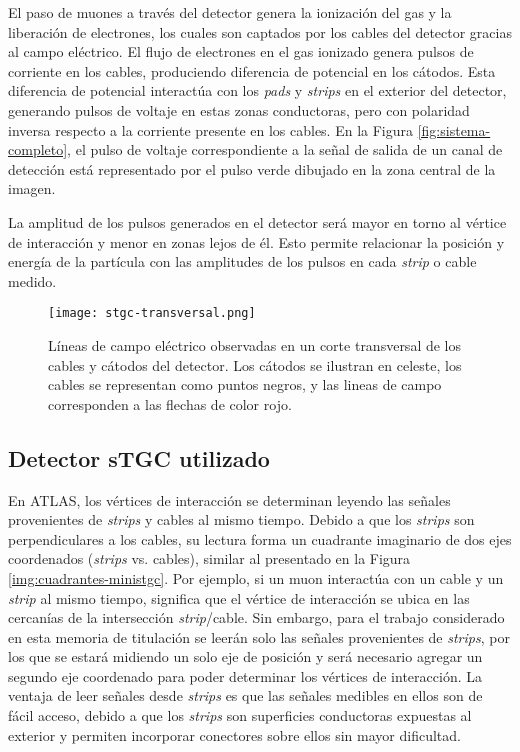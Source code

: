 	El paso de muones a través del detector genera la ionización del gas y la liberación de electrones, los cuales son captados por los cables del detector gracias al campo eléctrico. El flujo de electrones en el gas ionizado genera pulsos de corriente en los cables, produciendo diferencia de potencial en los cátodos. Esta diferencia de potencial interactúa con los \textit{pads} y \textit{strips} en el exterior del detector, generando pulsos de voltaje en estas zonas conductoras, pero con polaridad inversa respecto a la corriente presente en los cables. En la Figura \ref{fig:sistema-completo}, el pulso de voltaje correspondiente a la señal de salida de un canal de detección está representado por el pulso verde dibujado en la zona central de la imagen.
	
	La amplitud de los pulsos generados en el detector será mayor en torno al vértice de interacción y menor en zonas lejos de él. Esto permite relacionar la posición y energía de la partícula con las amplitudes de los pulsos en cada \textit{strip} o cable medido.
	
	\begin{figure}[h]
		\centering
		\texttt{[image: stgc-transversal.png]}
		\caption{Líneas de campo eléctrico observadas en un corte transversal de los cables y cátodos del detector. Los cátodos se ilustran en celeste, los cables se representan como puntos negros, y las lineas de campo corresponden a las flechas de color rojo\cite{DeSmet2011StudyLab}.}
		\label{img:stgc-field}
	\end{figure}

\subsection{Detector sTGC utilizado}
	En ATLAS, los vértices de interacción se determinan leyendo las señales provenientes de \textit{strips} y cables al mismo tiempo. Debido a que los \textit{strips} son perpendiculares a los cables, su lectura forma un cuadrante imaginario de dos ejes coordenados (\textit{strips} vs. cables), similar al presentado en la Figura \ref{img:cuadrantes-ministgc}. Por ejemplo, si un muon interactúa con un cable y un \textit{strip} al mismo tiempo, significa que el vértice de interacción se ubica en las cercanías de la intersección \textit{strip}/cable. Sin embargo, para el trabajo considerado en esta memoria de titulación se leerán solo las señales provenientes de \textit{strips}, por los que se estará midiendo un solo eje de posición y será necesario agregar un segundo eje coordenado para poder determinar los vértices de interacción. La ventaja de leer señales desde \textit{strips} es que las señales medibles en ellos son de fácil acceso, debido a que los \textit{strips} son superficies conductoras expuestas al exterior y permiten incorporar conectores sobre ellos sin mayor dificultad.
	
